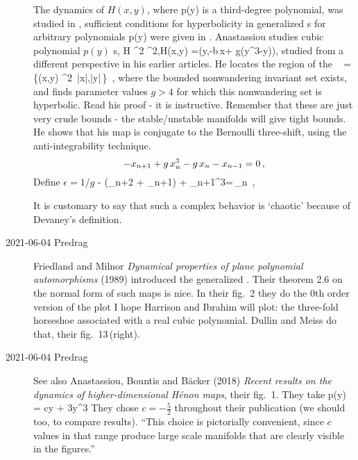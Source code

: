 \begin{description}
The dynamics of $H(x,y)$, where p(y) is a third-degree polynomial, was
studied in , sufficient conditions for hyperbolicity in
generalized {\HenonMap}s for arbitrary polynomials p(y) were given in
. Anastassiou studies cubic polynomial $p(y)$
{\HenonMap}s,
\beq
H\colon {} ^2\to {} ^2,\qquad H(x,y)
=\bigl(y,-b\,x+ g(y^3-y)\bigr),
studied from a different perspective in his earlier
articles. He locates the region of the \statesp\
\beq
{} =
\biggl\{(x,y)\in {} ^2\colon\,
 |x|,|y|\le {}\,\biggr\}
\,,
where the bounded  nonwandering invariant set exists, and finds parameter
values \(g>4\) for which this nonwandering set is hyperbolic. Read his
proof - it is instructive.
Remember that these are just very crude bounds - the stable/unstable
manifolds will give tight bounds.
He shows that his map is conjugate to the Bernoulli three-shift, using
the anti-integrability technique\rf{aub95ant,Chen04,BolMac97,BaChMa13}.
\[
-x_{n+1} + g\,x_{n}^3  -g\,x_{n} - x_{n-1}=0
\,,
\]
Define $\epsilon =1/g$
\beq
- \epsilon(\ssp_{n+2} + \ssp_{n+1}) + \ssp_{n+1}^3=\epsilon \,\ssp_n
\,,

It is customary to say that such a complex behavior is `chaotic' because
of Devaney's definition\rf{BBCDS92}.

\item[2021-06-04 Predrag]
Friedland and Milnor
{\em Dynamical properties of plane polynomial automorphisms} (1989)
introduced the generalized \HenonMap. Their theorem 2.6 on the normal
form of such maps is nice. In their fig.~2 they do the 0th order version
of the plot I hope Harrison and Ibrahim will plot: the three-fold
horseshoe associated with a real cubic polynomial.
Dullin and Meiss do that, their fig.~13\,(right).

\item[2021-06-04 Predrag]
See also Anastassiou, Bountis and B{\"a}cker (2018)
{\em {Recent results on the dynamics of higher-dimensional {H{\'{e}}non} maps}},
their fig.~1. They take
\beq
p(y) = cy + 3y^3
They chose $c=-\frac{5}{2}$ throughout their publication (we should too,
to compare results).
``This choice is pictorially convenient, since $c$ values in that range
produce large scale manifolds that are clearly visible in the figures.''


\end{description}
